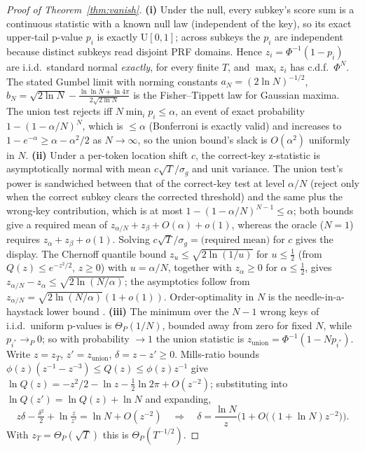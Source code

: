 \documentclass{article} %
\begin{document}
\begin{proof}[Proof of Theorem~\ref{thm:vanish}]
\textbf{(i)} Under the null, every subkey's score sum is a continuous
statistic with a known null law (independent of the key), so its exact
upper-tail p-value $p_i$ is exactly $\mathrm{U}[0,1]$; across subkeys the
$p_i$ are independent because distinct subkeys read disjoint PRF domains.
Hence $z_i=\Phi^{-1}(1-p_i)$ are i.i.d.\ standard normal \emph{exactly},
for every finite $T$, and $\max_i z_i$ has c.d.f.\ $\Phi^N$. The stated
Gumbel limit with norming constants
$a_N=(2\ln N)^{-1/2}$, $b_N=\sqrt{2\ln N}-\frac{\ln\ln N+\ln4\pi}{2\sqrt{2\ln N}}$
is the Fisher--Tippett law for Gaussian maxima. The union test rejects iff
$N\min_i p_i\le\alpha$, an event of exact probability
$1-(1-\alpha/N)^N$, which is $\le\alpha$ (Bonferroni is exactly valid) and
increases to $1-e^{-\alpha}\ge\alpha-\alpha^2/2$ as $N\to\infty$, so the
union bound's slack is $O(\alpha^2)$ uniformly in $N$.
\textbf{(ii)} Under a per-token location shift $c$, the correct-key
z-statistic is asymptotically normal with mean $c\sqrt T/\sigma_g$ and unit
variance. The union test's power is sandwiched between that of the
correct-key test at level $\alpha/N$ (reject only when the correct subkey
clears the corrected threshold) and the same plus the wrong-key
contribution, which is at most $1-(1-\alpha/N)^{N-1}\le\alpha$; both
bounds give a required mean of $z_{\alpha/N}+z_{\beta}+O(\alpha)+o(1)$,
whereas the oracle ($N{=}1$) requires $z_\alpha+z_\beta+o(1)$. Solving
$c\sqrt T/\sigma_g=\text{(required mean)}$ for $c$ gives the display. The
Chernoff quantile bound $z_u\le\sqrt{2\ln(1/u)}$ for $u\le\tfrac12$
(from $Q(z)\le e^{-z^2/2}$, $z\ge0$) with $u=\alpha/N$, together with
$z_\alpha\ge0$ for $\alpha\le\tfrac12$, gives
$z_{\alpha/N}-z_\alpha\le\sqrt{2\ln(N/\alpha)}$; the asymptotics follow
from $z_{\alpha/N}=\sqrt{2\ln(N/\alpha)}(1+o(1))$. Order-optimality in $N$
is the needle-in-a-haystack lower bound \citep{ingster1997,donoho2004higher}.
\textbf{(iii)} The minimum over the $N-1$ wrong keys of i.i.d.\ uniform
p-values is $\Theta_P(1/N)$, bounded away from zero for fixed $N$, while
$p_{i^*}\to_P0$; so with probability $\to1$ the union statistic is
$z_{\mathrm{union}}=\Phi^{-1}(1-Np_{i^*})$. Write $z=z_T$,
$z'=z_{\mathrm{union}}$, $\delta=z-z'\ge0$. Mills-ratio bounds
$\phi(z)(z^{-1}-z^{-3})\le Q(z)\le\phi(z)z^{-1}$ give
$\ln Q(z)=-z^2/2-\ln z-\tfrac12\ln2\pi+O(z^{-2})$; substituting into
$\ln Q(z')=\ln Q(z)+\ln N$ and expanding,
\[
z\delta-\tfrac{\delta^2}{2}+\ln\tfrac{z}{z'}=\ln N+O(z^{-2})
\quad\Longrightarrow\quad
\delta=\frac{\ln N}{z}\Big(1+O\big((1{+}\ln N)z^{-2}\big)\Big).
\]
With $z_T=\Theta_P(\sqrt T)$ this is $\Theta_P(T^{-1/2})$.
\end{proof}
\end{document}

